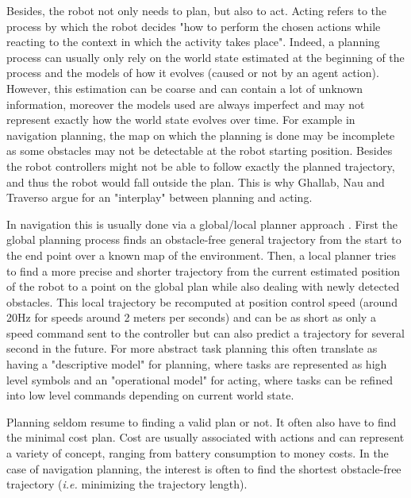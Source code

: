 \documentclass[a4paper,11pt,twoside]{StyleThese}
\begin{document}
Besides, the robot not only needs to plan, but also to act. Acting refers to the process by which the robot decides "how to perform the chosen actions while reacting to the context in which the activity takes place". Indeed, a planning process can usually only rely on the world state estimated at the beginning of the process and the models of how it evolves (caused or not by an agent action). However, this estimation can be coarse and can contain a lot of unknown information, moreover the models used are always imperfect and may not represent exactly how the world state evolves over time. For example in navigation planning, the map on which the planning is done may be incomplete as some obstacles may not be detectable at the robot starting position. Besides the robot controllers might not be able to follow exactly the planned trajectory, and thus the robot would fall outside the plan. This is why Ghallab, Nau and Traverso argue for an "interplay" between planning and acting.

In navigation this is usually done via a global/local planner approach \cite{choset2005principles} . First the global planning process finds an obstacle-free general trajectory from the start to the end point over a known map of the environment. Then, a local planner tries to find a more precise and shorter trajectory from the current estimated position of the robot to a point on the global plan while also dealing with newly detected obstacles. This local trajectory be recomputed at position control speed (around 20Hz for speeds around 2 meters per seconds) and can be as short as only a speed command sent to the controller  but can also predict a trajectory for several second in the future.  For more abstract task planning this often translate as having a "descriptive model" for planning, where tasks are represented as high level symbols and an "operational model" for acting, where tasks can be refined into low level commands depending on current world state. 

Planning seldom resume to finding a valid plan or not. It often also have to find the minimal cost plan. Cost are usually associated with actions and can represent a variety of concept, ranging from battery consumption to money costs. In the case of navigation planning, the interest is often to find the shortest obstacle-free trajectory (\textit{i.e.} minimizing the trajectory length).
\end{document}
